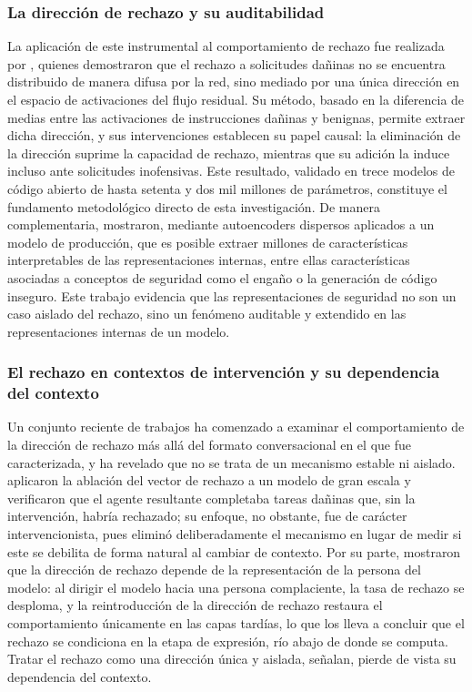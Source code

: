 \subsubsection*{La dirección de rechazo y su auditabilidad}

La aplicación de este instrumental al comportamiento de rechazo fue realizada por \textcite{arditi2024}, quienes demostraron que el rechazo a solicitudes dañinas no se encuentra distribuido de manera difusa por la red, sino mediado por una única dirección en el espacio de activaciones del flujo residual. Su método, basado en la diferencia de medias entre las activaciones de instrucciones dañinas y benignas, permite extraer dicha dirección, y sus intervenciones establecen su papel causal: la eliminación de la dirección suprime la capacidad de rechazo, mientras que su adición la induce incluso ante solicitudes inofensivas. Este resultado, validado en trece modelos de código abierto de hasta setenta y dos mil millones de parámetros, constituye el fundamento metodológico directo de esta investigación. De manera complementaria, \textcite{templeton2024} mostraron, mediante autoencoders dispersos aplicados a un modelo de producción, que es posible extraer millones de características interpretables de las representaciones internas, entre ellas características asociadas a conceptos de seguridad como el engaño o la generación de código inseguro. Este trabajo evidencia que las representaciones de seguridad no son un caso aislado del rechazo, sino un fenómeno auditable y extendido en las representaciones internas de un modelo.

\subsubsection*{El rechazo en contextos de intervención y su dependencia del contexto}

Un conjunto reciente de trabajos ha comenzado a examinar el comportamiento de la dirección de rechazo más allá del formato conversacional en el que fue caracterizada, y ha revelado que no se trata de un mecanismo estable ni aislado. \textcite{lermen2024} aplicaron la ablación del vector de rechazo a un modelo de gran escala y verificaron que el agente resultante completaba tareas dañinas que, sin la intervención, habría rechazado; su enfoque, no obstante, fue de carácter intervencionista, pues eliminó deliberadamente el mecanismo en lugar de medir si este se debilita de forma natural al cambiar de contexto. Por su parte, \textcite{zhong2026} mostraron que la dirección de rechazo depende de la representación de la persona del modelo: al dirigir el modelo hacia una persona complaciente, la tasa de rechazo se desploma, y la reintroducción de la dirección de rechazo restaura el comportamiento únicamente en las capas tardías, lo que los lleva a concluir que el rechazo se condiciona en la etapa de expresión, río abajo de donde se computa. Tratar el rechazo como una dirección única y aislada, señalan, pierde de vista su dependencia del contexto.

